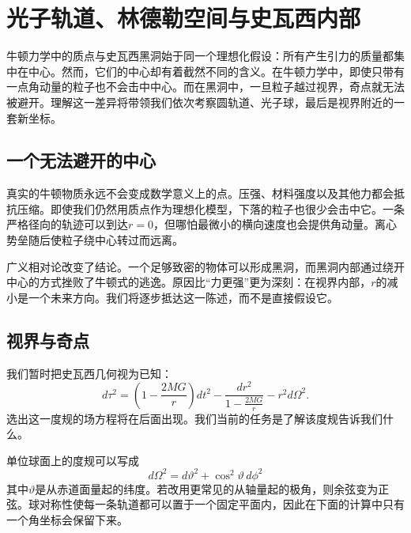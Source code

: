 \chapter{光子轨道、林德勒空间与史瓦西内部}

牛顿力学中的质点与史瓦西黑洞始于同一个理想化假设：所有产生引力的质量都集中在中心。然而，它们的中心却有着截然不同的含义。在牛顿力学中，即使只带有一点角动量的粒子也不会击中中心。而在黑洞中，一旦粒子越过视界，奇点就无法被避开。理解这一差异将带领我们依次考察圆轨道、光子球，最后是视界附近的一套新坐标。

\section{一个无法避开的中心}

真实的牛顿物质永远不会变成数学意义上的点。压强、材料强度以及其他力都会抵抗压缩。即使我们仍然用质点作为理想化模型，下落的粒子也很少会击中它。一条严格径向的轨迹可以到达\(r=0\)，但哪怕最微小的横向速度也会提供角动量。离心势垒随后使粒子绕中心转过而远离。

广义相对论改变了结论。一个足够致密的物体可以形成黑洞，而黑洞内部通过绕开中心的方式挫败了牛顿式的逃逸。原因比“力更强”更为深刻：在视界内部，\(r\)的减小是一个未来方向。我们将逐步抵达这一陈述，而不是直接假设它。

\begin{classroomqa}
\end{classroomqa}

\section{视界与奇点}

我们暂时把史瓦西几何视为已知：
\begin{equation}
d\tau^{2}
=
\left(1-\frac{2MG}{r}\right)dt^{2}
-
\frac{dr^{2}}{1-\frac{2MG}{r}}
-
r^{2}d\Omega^{2}.
\label{eq:l6-schwarzschild}
\end{equation}
选出这一度规的场方程将在后面出现。我们当前的任务是了解该度规告诉我们什么。

单位球面上的度规可以写成
\begin{equation}
d\Omega^{2}
=d\vartheta^{2}+\cos^{2}\vartheta\,d\phi^{2}
\label{eq:l6-angular-metric}
\end{equation}
其中\(\vartheta\)是从赤道面量起的纬度。若改用更常见的从轴量起的极角，则余弦变为正弦。球对称性使每一条轨道都可以置于一个固定平面内，因此在下面的计算中只有一个角坐标会保留下来。

